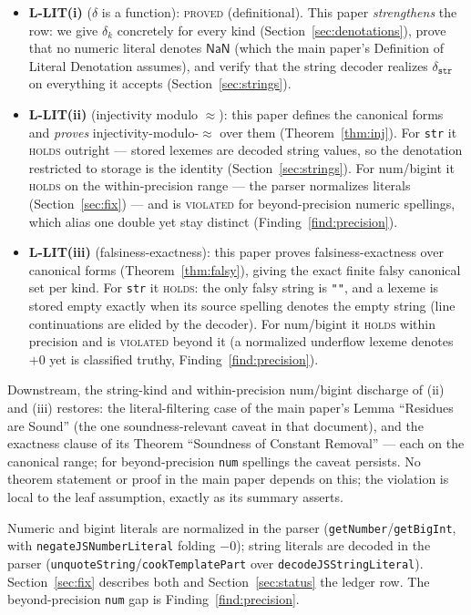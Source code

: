 \documentclass[11pt]{article}
\begin{document}
\begin{itemize}
\item \textbf{L-LIT(i)} ($\delta$ is a function): \textsc{proved}
  (definitional). This paper \emph{strengthens} the row: we
  give $\delta_k$ concretely for every kind
  (Section~\ref{sec:denotations}), prove that no numeric literal denotes
  $\mathsf{NaN}$ (which the main paper's Definition of Literal Denotation
  assumes), and verify that the string decoder realizes
  $\delta_{\texttt{str}}$ on everything it accepts
  (Section~\ref{sec:strings}).
\item \textbf{L-LIT(ii)} (injectivity modulo $\approx$): this paper defines
  the canonical forms and \emph{proves} injectivity-modulo-$\approx$ over
  them (Theorem~\ref{thm:inj}). For \texttt{str} it \textsc{holds}
  outright — stored lexemes are decoded string values, so the denotation
  restricted to storage is the identity (Section~\ref{sec:strings}). For
  num/bigint it \textsc{holds} on the within-precision range — the
  parser normalizes literals (Section~\ref{sec:fix}) — and is
  \textsc{violated} for beyond-precision numeric spellings, which alias
  one double yet stay distinct (Finding~\ref{find:precision}).
\item \textbf{L-LIT(iii)} (falsiness-exactness): this paper proves
  falsiness-exactness over canonical forms (Theorem~\ref{thm:falsy}),
  giving the exact finite falsy canonical set per kind. For \texttt{str}
  it \textsc{holds}: the only falsy string is \texttt{""}, and a lexeme
  is stored empty exactly when its source spelling denotes the empty
  string (line continuations are elided by the decoder). For num/bigint
  it \textsc{holds} within precision and is \textsc{violated} beyond it
  (a normalized underflow lexeme denotes $+0$ yet is classified truthy,
  Finding~\ref{find:precision}).
\end{itemize}

Downstream, the string-kind and within-precision num/bigint discharge of
(ii) and (iii) restores: the literal-filtering case of the main paper's
Lemma ``Residues are Sound'' (the one soundness-relevant caveat in that
document), and the exactness clause of its Theorem ``Soundness of
Constant Removal'' — each on the canonical range; for beyond-precision
\texttt{num} spellings the caveat persists. No theorem statement or
proof in the main paper depends on this; the violation is local to the
leaf assumption, exactly as its summary asserts.

Numeric and bigint literals are normalized in the parser
(\texttt{getNumber}/\texttt{getBigInt}, with \texttt{negateJSNumberLiteral}
folding $-0$); string literals are decoded in the parser
(\texttt{unquoteString}/\texttt{cookTemplatePart} over
\texttt{decodeJSStringLiteral}). Section~\ref{sec:fix} describes both
and Section~\ref{sec:status} the ledger row. The beyond-precision
\texttt{num} gap is Finding~\ref{find:precision}.
\end{document}

